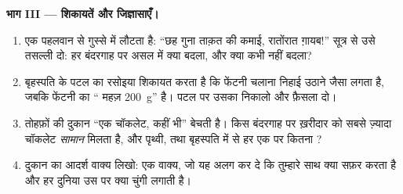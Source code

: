 \begin{problem}
\medskip\noindent\textbf{भाग III --- शिकायतें और जिज्ञासाएँ।}
\begin{enumerate}[resume]
  \item एक पहलवान  से गुस्से में लौटता है: ``छह गुना ताक़त की
        कमाई, रातोंरात ग़ायब!'' सूत्र से उसे तसल्ली दो: हर बंदरगाह पर
        असल में क्या बदला, और क्या कभी नहीं बदला?
  \item बृहस्पति के पटल का रसोइया शिकायत करता है कि फेंटनी चलाना
        निहाई उठाने जैसा लगता है, जबकि फेंटनी का `` महज़
        \qty{200}{g}'' है। पटल पर उसका  निकालो और फ़ैसला दो।
  \item तोहफ़ों की दुकान ``एक  चॉकलेट, कहीं भी'' बेचती है। किस
        बंदरगाह पर ख़रीदार को सबसे ज़्यादा चॉकलेट \emph{सामान} मिलता
        है, और पृथ्वी,  तथा बृहस्पति में से हर एक पर कितना
        ?
  \item दुकान का आदर्श वाक्य लिखो: एक वाक्य, जो यह अलग कर दे कि
        तुम्हारे साथ क्या सफ़र करता है और हर दुनिया उस पर क्या चुंगी
        लगाती है।
\end{enumerate}
\end{problem}
